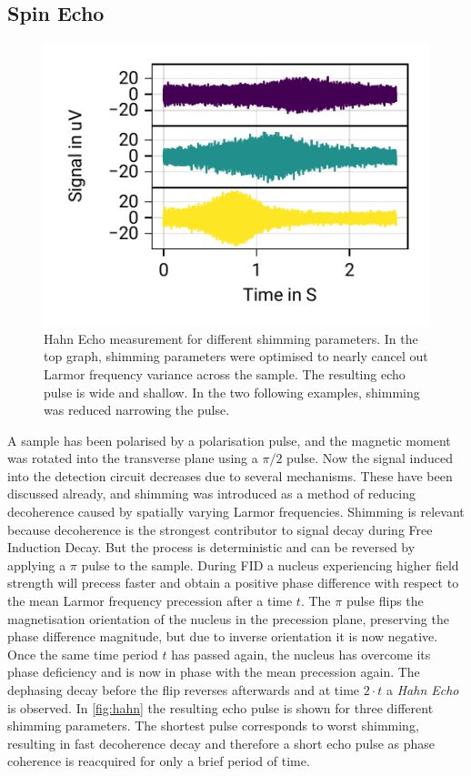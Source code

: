\documentclass[
    parskip=half, 
    twoside=false,
    twocolumn=true,
    fontsize=11pt,
]{scrarticle}
\begin{document}
\subsection{Spin Echo}
\begin{figure}
    \centering
    \includegraphics{figures/04 spin echo shims.pdf}
    \caption{Hahn Echo measurement for different shimming parameters. In the top graph, shimming parameters were optimised to nearly cancel out Larmor frequency variance across the sample. The resulting echo pulse is wide and shallow. In the two following examples, shimming was reduced narrowing the pulse.}
    \label{fig:hahn}
\end{figure}
A sample has been polarised by a polarisation pulse, and the magnetic moment was rotated into the transverse plane using a $\pi/2$ pulse. Now the signal induced into the detection circuit decreases due to several mechanisms. These have been discussed already, and shimming was introduced as a method of reducing decoherence caused by spatially varying Larmor frequencies. Shimming is relevant because decoherence is the strongest contributor to signal decay during Free Induction Decay. But the process is deterministic and can be reversed by applying a $\pi$ pulse to the sample. During FID a nucleus experiencing higher field strength will precess faster and obtain a positive phase difference with respect to the mean Larmor frequency precession after a time $t$. The $\pi$ pulse flips the magnetisation orientation of the nucleus in the precession plane, preserving the phase difference magnitude, but due to inverse orientation it is now negative. Once the same time period $t$ has passed again, the nucleus has overcome its phase deficiency and is now in phase with the mean precession again. The dephasing decay before the flip reverses afterwards and at time $2\cdot t$ a \textit{Hahn Echo} is observed. In \autoref{fig:hahn} the resulting echo pulse is shown for three different shimming parameters. The shortest pulse corresponds to worst shimming, resulting in fast decoherence decay and therefore a short echo pulse as phase coherence is reacquired for only a brief period of time.
\end{document}
